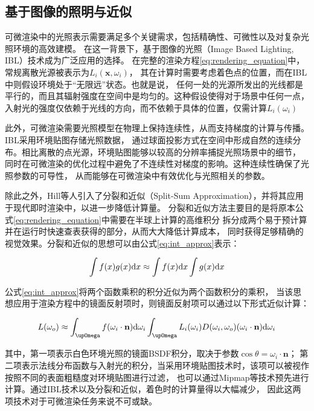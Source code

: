 \subsection{基于图像的照明与近似}
可微渲染中的光照表示需要满足多个关键需求，包括精确性、可微性以及对复杂光照环境的高效建模。
在这一背景下，基于图像的光照（Image Based Lighting, IBL）技术成为广泛应用的选择。
在完整的渲染方程\eqref{eq:rendering_equation}中，常规离散光源被表示为$L_i(\mathbf{x},\omega_i)$，
其在计算时需要考虑着色点的位置，而在IBL中则假设环境处于“无限远”状态。也就是说，
任何一处的光源所发出的光线都是平行的，而且其辐射强度在空间中是均匀的。这种假设使得对于场景中任何一点，
入射光的强度仅依赖于光线的方向，而不依赖于具体的位置，仅需计算$L_i(\omega_i)$

此外，可微渲染需要光照模型在物理上保持连续性，从而支持梯度的计算与传播。IBL采用环境贴图存储光照数据，
通过球面投影方式在空间中形成自然的连续分布。相比离散的点光源，环境贴图能够以较高的分辨率捕捉光照场景中的细节，
同时在可微渲染的优化过程中避免了不连续性对梯度的影响。这种连续性确保了光照参数的可导性，
从而能够在可微渲染中有效优化与光照相关的参数。

除此之外，Hill等人\cite{Hill_2014}引入了分裂和近似（Split-Sum Approximation），并将其应用于现代即时渲染中，以进一步降低计算量。
分裂和近似方法主要目的是将原本公式\eqref{eq:rendering_equation}中需要在半球上计算的高维积分
拆分成两个易于预计算并在运行时快速查表获得的部分，从而大大降低计算成本，
同时获得足够精确的视觉效果。分裂和近似的思想可以由公式\eqref{eq:int_approx}表示：

\begin{equation}
  \int f(x)g(x){\rm{d}}x\approx\int f(x){\rm{d}}x\int g(x){\rm{d}}x
  \label{eq:int_approx}
\end{equation}

公式\eqref{eq:int_approx}将两个函数乘积的积分近似为两个函数积分的乘积，
当该思想应用于渲染方程中的镜面反射项时，则镜面反射项可以通过以下形式近似计算：

\begin{equation}
  L(\omega_o)\approx 
  \int_{\upOmega}{f(\omega_i\cdot{\bf{n}}){\rm{d}}\omega_i}
  \int_{\upOmega}{L_i(\omega_i)D(\omega_i,\omega_o)(\omega_i\cdot{\bf{n}}){\rm{d}}\omega_i}
  \label{eq:L_omega_o_approx}
\end{equation}

其中，第一项表示白色环境光照的镜面BSDF积分，取决于参数$\cos{\theta}=\omega_i\cdot{\mathbf{n}}；$
第二项表示法线分布函数与入射光的积分，当采用环境贴图技术时，该项可以被视作按照不同的表面粗糙度对环境贴图进行过滤，
也可以通过Mipmap等技术预先进行计算。通过IBL技术以及分裂和近似，着色时的计算量得以大幅减少，
因此这两项技术对于可微渲染任务来说不可或缺。

